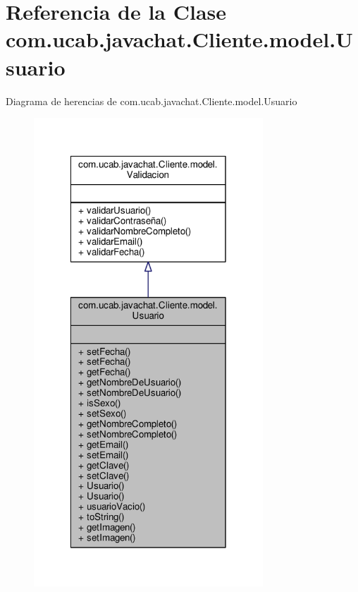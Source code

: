 \hypertarget{classcom_1_1ucab_1_1javachat_1_1_cliente_1_1model_1_1_usuario}{\section{Referencia de la Clase com.\-ucab.\-javachat.\-Cliente.\-model.\-Usuario}
\label{classcom_1_1ucab_1_1javachat_1_1_cliente_1_1model_1_1_usuario}
}


Diagrama de herencias de com.\-ucab.\-javachat.\-Cliente.\-model.\-Usuario
\nopagebreak
\begin{figure}[H]
\begin{center}
\leavevmode
\includegraphics[width=244pt]{d2/df1/classcom_1_1ucab_1_1javachat_1_1_cliente_1_1model_1_1_usuario__inherit__graph}
\end{center}
\end{figure}


